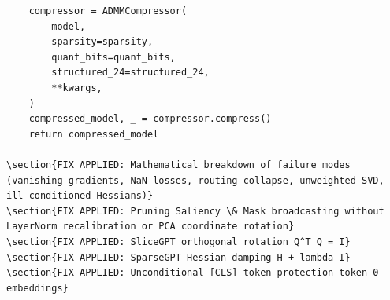 \begin{lstlisting}
    compressor = ADMMCompressor(
        model,
        sparsity=sparsity,
        quant_bits=quant_bits,
        structured_24=structured_24,
        **kwargs,
    )
    compressed_model, _ = compressor.compress()
    return compressed_model

\section{FIX APPLIED: Mathematical breakdown of failure modes (vanishing gradients, NaN losses, routing collapse, unweighted SVD, ill-conditioned Hessians)}
\section{FIX APPLIED: Pruning Saliency \& Mask broadcasting without LayerNorm recalibration or PCA coordinate rotation}
\section{FIX APPLIED: SliceGPT orthogonal rotation Q^T Q = I}
\section{FIX APPLIED: SparseGPT Hessian damping H + lambda I}
\section{FIX APPLIED: Unconditional [CLS] token protection token 0 embeddings}
\end{lstlisting}
